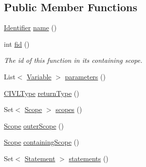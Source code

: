 \subsection*{Public Member Functions}
\begin{DoxyCompactItemize}
\item 
\hyperlink{interfaceedu_1_1udel_1_1cis_1_1vsl_1_1civl_1_1model_1_1IF_1_1Identifier}{Identifier} \hyperlink{interfaceedu_1_1udel_1_1cis_1_1vsl_1_1civl_1_1model_1_1IF_1_1CIVLFunction_a668cf110716020f1cbed4e0dcfd5b79a}{name} ()
\item 
int \hyperlink{interfaceedu_1_1udel_1_1cis_1_1vsl_1_1civl_1_1model_1_1IF_1_1CIVLFunction_a4c3aa0692120f075d306042497333895}{fid} ()
\begin{DoxyCompactList}\small\item\em The id of this function in its containing scope. \end{DoxyCompactList}\item 
List$<$ \hyperlink{interfaceedu_1_1udel_1_1cis_1_1vsl_1_1civl_1_1model_1_1IF_1_1variable_1_1Variable}{Variable} $>$ \hyperlink{interfaceedu_1_1udel_1_1cis_1_1vsl_1_1civl_1_1model_1_1IF_1_1CIVLFunction_a71f432d9dddc310d399f7ca6ce4b9b29}{parameters} ()
\item 
\hyperlink{interfaceedu_1_1udel_1_1cis_1_1vsl_1_1civl_1_1model_1_1IF_1_1type_1_1CIVLType}{C\+I\+V\+L\+Type} \hyperlink{interfaceedu_1_1udel_1_1cis_1_1vsl_1_1civl_1_1model_1_1IF_1_1CIVLFunction_adf5138531beb65661edfe7ed1704f621}{return\+Type} ()
\item 
Set$<$ \hyperlink{interfaceedu_1_1udel_1_1cis_1_1vsl_1_1civl_1_1model_1_1IF_1_1Scope}{Scope} $>$ \hyperlink{interfaceedu_1_1udel_1_1cis_1_1vsl_1_1civl_1_1model_1_1IF_1_1CIVLFunction_a2b6128a907c9035723d856d1ad1129ab}{scopes} ()
\item 
\hyperlink{interfaceedu_1_1udel_1_1cis_1_1vsl_1_1civl_1_1model_1_1IF_1_1Scope}{Scope} \hyperlink{interfaceedu_1_1udel_1_1cis_1_1vsl_1_1civl_1_1model_1_1IF_1_1CIVLFunction_ae55c1a049f6bcca7d200abb1643ccfdc}{outer\+Scope} ()
\item 
\hyperlink{interfaceedu_1_1udel_1_1cis_1_1vsl_1_1civl_1_1model_1_1IF_1_1Scope}{Scope} \hyperlink{interfaceedu_1_1udel_1_1cis_1_1vsl_1_1civl_1_1model_1_1IF_1_1CIVLFunction_a0cb103e0669baadf5b589b706b0c7f2c}{containing\+Scope} ()
\item 
Set$<$ \hyperlink{interfaceedu_1_1udel_1_1cis_1_1vsl_1_1civl_1_1model_1_1IF_1_1statement_1_1Statement}{Statement} $>$ \hyperlink{interfaceedu_1_1udel_1_1cis_1_1vsl_1_1civl_1_1model_1_1IF_1_1CIVLFunction_a790b51fe1bc9aedbd718329cd7e757f3}{statements} ()

\end{DoxyCompactItemize}
